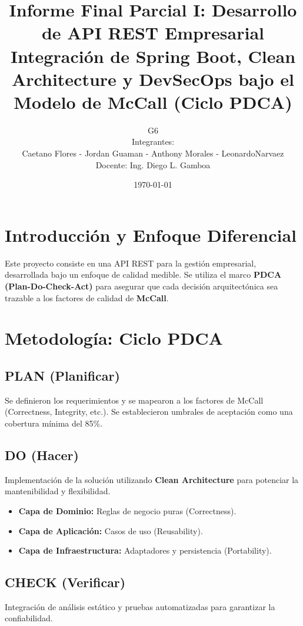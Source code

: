 \documentclass[12pt,a4paper]{article}
\title{
    \vspace{-2cm}
    \vspace{1cm}
    \textbf{Informe Final Parcial I: Desarrollo de API REST Empresarial} \\
    \large Integración de Spring Boot, Clean Architecture y DevSecOps bajo el Modelo de McCall (Ciclo PDCA) 
}
\author{G6 \\ \small Integrantes: \\Caetano Flores - Jordan Guaman - Anthony Morales - LeonardoNarvaez \\ \small Docente: Ing. Diego L. Gamboa }
\date{\today}
\begin{document}
\maketitle

\section{Introducción y Enfoque Diferencial}
Este proyecto consiste en una API REST para la gestión empresarial, desarrollada bajo un enfoque de calidad medible. Se utiliza el marco \textbf{PDCA (Plan-Do-Check-Act)} para asegurar que cada decisión arquitectónica sea trazable a los factores de calidad de \textbf{McCall}.

\section{Metodología: Ciclo PDCA}

\subsection{PLAN (Planificar)}
Se definieron los requerimientos y se mapearon a los factores de McCall (Correctness, Integrity, etc.). Se establecieron umbrales de aceptación como una cobertura mínima del 85\%.

\subsection{DO (Hacer)}
Implementación de la solución utilizando \textbf{Clean Architecture} para potenciar la mantenibilidad y flexibilidad. 
\begin{itemize}
    \item \textbf{Capa de Dominio:} Reglas de negocio puras (Correctness).
    \item \textbf{Capa de Aplicación:} Casos de uso (Reusability).
    \item \textbf{Capa de Infraestructura:} Adaptadores y persistencia (Portability).
\end{itemize}


\subsection{CHECK (Verificar)}
Integración de análisis estático y pruebas automatizadas para garantizar la confiabilidad.
\end{document}
